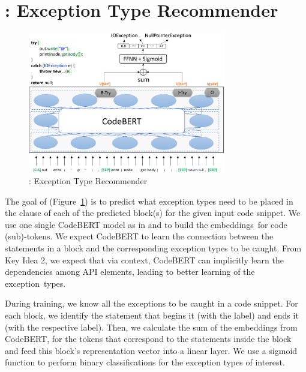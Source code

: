\section{{\xtype}: Exception Type Recommender}
\label{sec:xtype}

\begin{figure}[t]
\begin{center}
\includegraphics[width=3.4in]{xtype-7.png} %
\vspace{-19pt}
\caption{{\xtype}: Exception Type Recommender}
\label{fig:xtype}
\end{center}
\end{figure}

The goal of {\xtype} (Figure~\ref{fig:xtype}) is to predict what
exception types need to be placed in the  clause of each
of the predicted  block(s) for the given input code
snippet. We use one single CodeBERT model as
in {\xblock} and {\xstate} to build the embeddings~for code (sub)-tokens.
%
We expect CodeBERT to learn the connection between the statements in a
 block and the corresponding excep\-tion types to be
caught. From Key Idea 2, we expect that via context, CodeBERT can
implicitly learn the dependencies among API elements, leading to
better learning of the exception~types.

During training, we know all the exceptions to be caught in a code
snippet. For each  block, we identify the statement
that begins it (with the  label) and ends it (with the
respective  label). Then, we calculate the sum of the embeddings from
CodeBERT, for the \code{[SEP]} tokens that correspond to the statements
inside the  block and feed this  block's representation vector into a linear layer.
We use a sigmoid function to perform binary classifications for the
exception types of interest.

